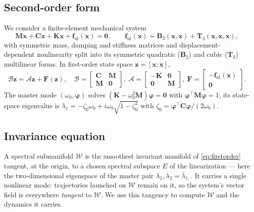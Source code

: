 \documentclass[11pt]{article}
\begin{document}
\subsection{Second-order form}
We consider a finite-element mechanical system
\begin{equation}
\bm{M}\ddot{\bm{x}} + \bm{C}\dot{\bm{x}} + \bm{K}\bm{x}
 + \bm{f}_{\mathrm{nl}}(\bm{x}) = \bm 0,
\qquad
\bm f_{\mathrm{nl}}(\bm x) = \bm B_2(\bm x,\bm x) + \bm T_3(\bm x,\bm x,\bm x),
\label{eq:eom}
\end{equation}
with symmetric mass, damping and stiffness matrices and displacement-dependent
nonlinearity split into its symmetric quadratic ($\bm B_2$) and cubic ($\bm T_3$)
multilinear forms. In first-order state space $\bm z=[\bm x;\dot{\bm x}]$,
\begin{equation}
\bm{\mathcal B}\dot{\bm z}=\bm{\mathcal A}\bm z+\bm F(\bm z),\quad
\bm{\mathcal B}=\begin{bmatrix}\bm C&\bm M\\\bm M&\bm 0\end{bmatrix},\;
\bm{\mathcal A}=\begin{bmatrix}-\bm K&\bm 0\\\bm 0&\bm M\end{bmatrix},\;
\bm F=\begin{bmatrix}-\bm f_{\mathrm{nl}}(\bm x)\\\bm 0\end{bmatrix}.
\label{eq:firstorder}
\end{equation}
The master mode $(\omega_0,\bm\varphi)$ solves $(\bm K-\omega_0^2\bm M)\bm\varphi=\bm0$
with $\bm\varphi^{\!\top}\bm M\bm\varphi=1$; its state-space eigenvalue is
$\lambda_1=-\zeta_0\omega_0+i\omega_0\sqrt{1-\zeta_0^2}$ with
$\zeta_0=\bm\varphi^{\!\top}\bm C\bm\varphi/(2\omega_0)$.

\subsection{Invariance equation}
A spectral submanifold $\mathcal W$ is the smoothest invariant manifold of
\eqref{eq:firstorder} tangent, at the origin, to a chosen spectral subspace $E$
of the linearization --- here the two-dimensional eigenspace of the master pair
$\lambda_1,\lambda_2=\bar\lambda_1$ \cite{haller2016,jain2022}. It carries a
single nonlinear mode: trajectories launched on $\mathcal W$ remain on it, so the
system's vector field is everywhere \emph{tangent} to $\mathcal W$. We use this
tangency to compute $\mathcal W$ and the dynamics it carries.
\end{document}
